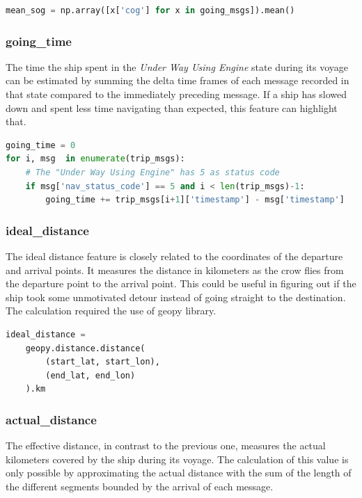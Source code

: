     \begin{lstlisting}[language=Python, frame=none]
mean_sog = np.array([x['cog'] for x in going_msgs]).mean()
    \end{lstlisting} 
    
    \subsubsection{going\_time}
    The time the ship spent in the \textit{Under Way Using Engine} state during its voyage can be estimated by summing the delta time frames of each message recorded in that state compared to the immediately preceding message. If a ship has slowed down and spent less time navigating than expected, this feature can highlight that.
    
    \begin{lstlisting}[language=Python, frame=none]
going_time = 0
for i, msg  in enumerate(trip_msgs):
    # The "Under Way Using Engine" has 5 as status code 
    if msg['nav_status_code'] == 5 and i < len(trip_msgs)-1:
        going_time += trip_msgs[i+1]['timestamp'] - msg['timestamp']
    \end{lstlisting} 

    
    \subsubsection{ideal\_distance}
    
    The ideal distance feature is closely related to the coordinates of the departure and arrival points. It measures the distance in kilometers as the crow flies from the departure point to the arrival point. This could be useful in figuring out if the ship took some unmotivated detour instead of going straight to the destination.
    \\
    The calculation required the use of geopy \cite{geopy} library.
    
    \begin{lstlisting}[language=Python, frame=none]
ideal_distance =
    geopy.distance.distance(
        (start_lat, start_lon),
        (end_lat, end_lon)
    ).km
    \end{lstlisting} 
    
    \subsubsection{actual\_distance}
    
    The effective distance, in contrast to the previous one, measures the actual kilometers covered by the ship during its voyage. The calculation of this value is only possible by approximating the actual distance with the sum of the length of the different segments bounded by the arrival of each message.
    
